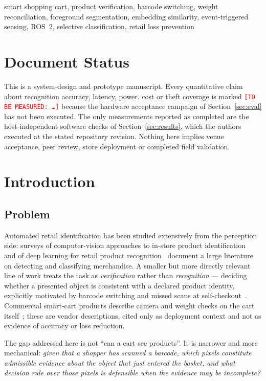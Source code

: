 \documentclass[conference]{IEEEtran}
\newcommand{\tbm}[1]{\textcolor{red}{\texttt{[TO BE MEASURED: #1]}}}
\begin{document}
\begin{IEEEkeywords}
smart shopping cart, product verification, barcode switching, weight reconciliation, foreground
segmentation, embedding similarity, event-triggered sensing, ROS~2, selective classification, retail
loss prevention
\end{IEEEkeywords}

\section*{Document Status}
This is a system-design and prototype manuscript. Every quantitative claim about recognition
accuracy, latency, power, cost or theft coverage is marked \tbm{\ldots} because the hardware
acceptance campaign of Section~\ref{sec:eval} has not been executed. The only measurements reported
as completed are the host-independent software checks of Section~\ref{sec:results}, which the authors
executed at the stated repository revision. Nothing here implies venue acceptance, peer review, store
deployment or completed field validation.

\section{Introduction}
\label{sec:intro}

\subsection{Problem}
Automated retail identification has been studied extensively from the perception side: surveys of
computer-vision approaches to in-store product identification~\cite{R49} and of deep learning for
retail product recognition~\cite{R50} document a large literature on detecting and classifying
merchandise. A smaller but more directly relevant line of work treats the task as \emph{verification}
rather than \emph{recognition} --- deciding whether a presented object is consistent with a declared
product identity, explicitly motivated by barcode switching and missed scans at
self-checkout~\cite{R51}. Commercial smart-cart products describe camera and weight checks on the
cart itself~\cite{R81,R82}; these are vendor descriptions, cited only as deployment context and not
as evidence of accuracy or loss reduction.

The gap addressed here is not ``can a cart see products''. It is narrower and more mechanical:
\emph{given that a shopper has scanned a barcode, which pixels constitute admissible evidence about
the object that just entered the basket, and what decision rule over those pixels is defensible when
the evidence may be incomplete?}
\end{document}
